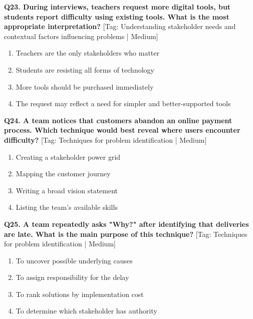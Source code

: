 \noindent\textbf{Q23. During interviews, teachers request more digital tools, but students report difficulty using existing tools. What is the most appropriate interpretation?} \hfill [Tag: Understanding stakeholder needs and contextual factors influencing problems | Medium]
\begin{enumerate}[label=(\alph*),topsep=2pt,itemsep=1pt,partopsep=0pt,parsep=0pt]
    \item {Teachers are the only stakeholders who matter}
    \item {Students are resisting all forms of technology}
    \item {More tools should be purchased immediately}
    \item {The request may reflect a need for simpler and better-supported tools}
\end{enumerate}
\vspace{2mm}

\noindent\textbf{Q24. A team notices that customers abandon an online payment process. Which technique would best reveal where users encounter difficulty?} \hfill [Tag: Techniques for problem identification | Medium]
\begin{enumerate}[label=(\alph*),topsep=2pt,itemsep=1pt,partopsep=0pt,parsep=0pt]
    \item {Creating a stakeholder power grid}
    \item {Mapping the customer journey}
    \item {Writing a broad vision statement}
    \item {Listing the team's available skills}
\end{enumerate}
\vspace{2mm}

\noindent\textbf{Q25. A team repeatedly asks "Why?" after identifying that deliveries are late. What is the main purpose of this technique?} \hfill [Tag: Techniques for problem identification | Medium]
\begin{enumerate}[label=(\alph*),topsep=2pt,itemsep=1pt,partopsep=0pt,parsep=0pt]
    \item {To uncover possible underlying causes}
    \item {To assign responsibility for the delay}
    \item {To rank solutions by implementation cost}
    \item {To determine which stakeholder has authority}
\end{enumerate}
\vspace{2mm}

